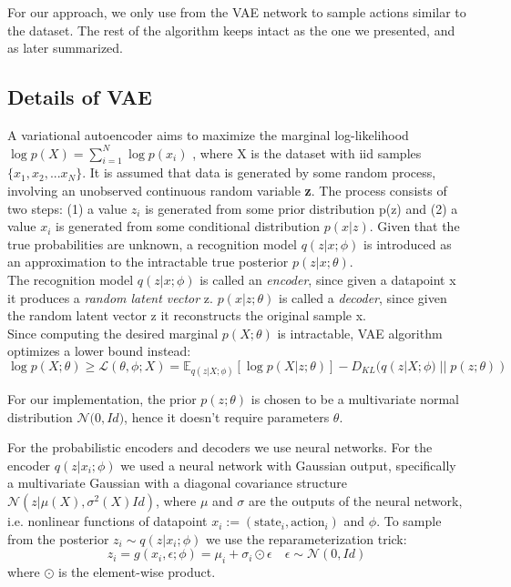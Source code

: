 For our approach, we only use from \citet{Fujimoto2018} the VAE network to sample actions similar to
the dataset.
The rest of the algorithm keeps intact as the one we presented, and as later summarized.



\subsection{Details of VAE}

A variational autoencoder aims to maximize the marginal log-likelihood $\log p(X) = \sum_{i=1}^{N}\log p(x_i)$
, where X is the dataset with iid samples $\{x_{1},x_2,...x_N\}$.
It is assumed that data is generated by some random process, involving an unobserved continuous
random variable \textbf{z}.
The process consists of two steps: (1) a value \textbf{$z_i$} is generated from some prior distribution p(z) and (2)
a value $x_i$ is generated from some conditional distribution $p(x|z)$.
Given that the true probabilities are unknown, a recognition model $q(z|x; \phi )$ is introduced
as an approximation to the intractable true posterior $p(z|x; \theta)$.\\
The recognition model $q(z|x; \phi)$ is called an \textit{encoder},  since given a datapoint x it produces
a \textit{random latent vector} z.
$p(x|z; \theta)$ is called a \textit{decoder},
since given the random latent vector z it reconstructs the original sample x.\\
Since computing the desired marginal $p(X; \theta)$ is intractable, VAE algorithm optimizes a lower bound instead:
\begin{equation}
    \log p(X; \theta) \geq \mathcal{L}(\theta, \phi; X) = \mathbb E_{q(z|X;\phi)} [\log p(X|z; \theta)] - D_{KL}(q(z|X;\phi)\; ||\;p(z; \theta))
\end{equation}

For our implementation, the prior $p(z; \theta)$ is chosen to be a multivariate normal
distribution $\mathcal{N}\big( 0,Id\big )$, hence it doesn't require parameters $\theta$.

For the probabilistic encoders and decoders we use neural networks.
For the encoder $q(z|x_i;\phi)$ we used a neural network with  Gaussian output, specifically a 
multivariate Gaussian with a diagonal covariance structure $\mathcal{N}(z | \mu(X), \sigma^2(X)Id )$,
where $\mu$ and $\sigma$ are the outputs of the neural network, i.e. nonlinear 
functions of datapoint $x_i:=(\text{state}_i,\text{action}_i)$ and $\phi$.
To sample from the posterior $z_i \sim q(z|x_i; \phi)$ we use the reparameterization trick:
\begin{equation}
    z_i = g(x_i, \epsilon; \phi)=\mu_i + \sigma_i \odot \epsilon \quad \epsilon \sim  \mathcal{N}(0,Id)
\end{equation}
where $\odot$ is the element-wise product.

